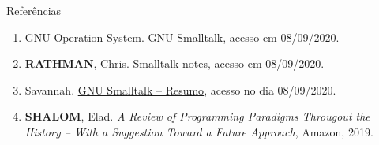 \begin{frame}[fragile]{Referências}

    \begin{enumerate}
        \item GNU Operation System. \href{https://www.gnu.org/software/smalltalk/}{GNU Smalltalk},
            acesso em 08/09/2020.
 

        \item \textbf{RATHMAN}, Chris. \href{http://www.angelfire.com/tx4/cus/notes/smalltalk.html}{Smalltalk notes}, acesso em 08/09/2020.
 
        \item Savannah. \href{https://savannah.gnu.org/projects/smalltalk}{GNU Smalltalk -- Resumo},
            acesso no dia 08/09/2020.

        \item \textbf{SHALOM}, Elad. \textit{A Review of Programming Paradigms Througout the 
            History -- With a Suggestion Toward a Future Approach}, Amazon, 2019.
    \end{enumerate}

\end{frame}
